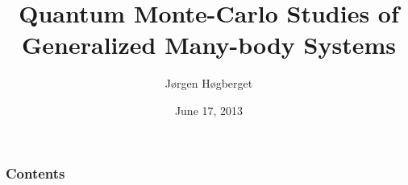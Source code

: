 \documentclass{beamer}
\title[Master Presentation]{Quantum Monte-Carlo Studies of Generalized Many-body Systems}
\author{Jørgen Høgberget}
\date{June 17, 2013}
\begin{document}
\begin{frame}
\titlepage
\end{frame}

\begin{frame}
 \frametitle{Contents}
 \tableofcontents[hideallsubsections]
\end{frame}




\end{document}
